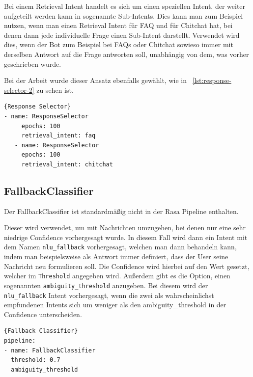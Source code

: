 Bei einem Retrieval Intent handelt es sich um einen speziellen Intent, der weiter aufgeteilt werden kann in sogenannte Sub-Intents.
Dies kann man zum Beispiel nutzen, wenn man einen Retrieval Intent für FAQ und für Chitchat hat, bei denen dann jede individuelle Frage einen Sub-Intent darstellt.\cite{retrievalIntent}
Verwendet wird dies, wenn der Bot zum Beispiel bei FAQs oder Chitchat sowieso immer mit derselben Antwort auf die Frage antworten soll, unabhängig von dem, was vorher geschrieben wurde.\cite{chitchatAndFaqs}

Bei der Arbeit wurde dieser Ansatz ebenfalls gewählt, wie in ~\ref{lst:response-selector-2} zu sehen ist.

\begin{lstlisting}[label={lst:response-selector-2},caption={Response Selector für Chitchat und FAQ}]{Response Selector}
- name: ResponseSelector
     epochs: 100
     retrieval_intent: faq
   - name: ResponseSelector
     epochs: 100
     retrieval_intent: chitchat
\end{lstlisting}

\subsection{FallbackClassifier}\label{subsec:fallback-classifier}

Der FallbackClassifier ist standardmäßig nicht in der Rasa Pipeline enthalten.\cite{startingPipelines}

Dieser wird verwendet, um mit Nachrichten umzugehen, bei denen nur eine sehr niedrige Confidence vorhergesagt wurde.
In diesem Fall wird dann ein Intent mit dem Namen \texttt{nlu\_fallback} vorhergesagt, welchen man dann behandeln kann, indem man beispielsweise als Antwort immer definiert, dass der User seine Nachricht neu formulieren soll.
Die Confidence wird hierbei auf den Wert gesetzt, welcher im \texttt{Threshold} angegeben wird.\cite{fallbackClassifier, nluFallback}
Außerdem gibt es die Option, einen sogenannten \texttt{ambiguity\_threshold} anzugeben.
Bei diesem wird der \texttt{nlu\_fallback} Intent vorhergesagt, wenn die zwei als wahrscheinlichst empfundenen Intents sich um weniger als den ambiguity\_threshold in der Confidence unterscheiden.\cite{fallbackClassifier}

\begin{lstlisting}[label={lst:fallback-classifier},caption={Fallback Classifier}]{Fallback Classifier}
pipeline:
- name: FallbackClassifier
  threshold: 0.7
  ambiguity_threshold
\end{lstlisting}


